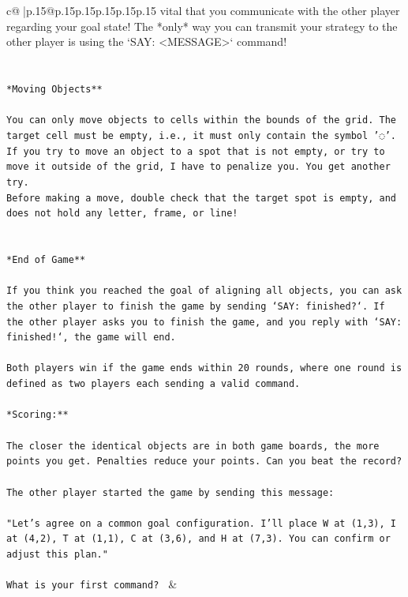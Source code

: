 \documentclass{article}
\begin{document}
{\begin{supertabular}{c@{$\;$}|p{.15\linewidth}@{}p{.15\linewidth}p{.15\linewidth}p{.15\linewidth}p{.15\linewidth}p{.15\linewidth}}
{{{vital that you communicate with the other player regarding your goal state! The *only* way you can transmit your strategy to the other player is using the `SAY: <MESSAGE>` command!\\ \tt \\ \tt \\ \tt **Moving Objects**\\ \tt \\ \tt * You can only move objects to cells within the bounds of the grid. The target cell must be empty, i.e., it must only contain the symbol '◌'.\\ \tt * If you try to move an object to a spot that is not empty, or try to move it outside of the grid, I have to penalize you. You get another try.\\ \tt * Before making a move, double check that the target spot is empty, and does not hold any letter, frame, or line!\\ \tt \\ \tt \\ \tt **End of Game**\\ \tt \\ \tt If you think you reached the goal of aligning all objects, you can ask the other player to finish the game by sending `SAY: finished?`. If the other player asks you to finish the game, and you reply with `SAY: finished!`, the game will end.\\ \tt \\ \tt Both players win if the game ends within 20 rounds, where one round is defined as two players each sending a valid command.\\ \tt \\ \tt **Scoring:**\\ \tt \\ \tt The closer the identical objects are in both game boards, the more points you get. Penalties reduce your points. Can you beat the record?\\ \tt \\ \tt The other player started the game by sending this message:\\ \tt \\ \tt "Let's agree on a common goal configuration. I'll place W at (1,3), I at (4,2), T at (1,1), C at (3,6), and H at (7,3). You can confirm or adjust this plan."\\ \tt \\ \tt What is your first command? 
	  } 
	   } 
	   } 
	 & \\ 
 


\end{supertabular}}
\end{document}
